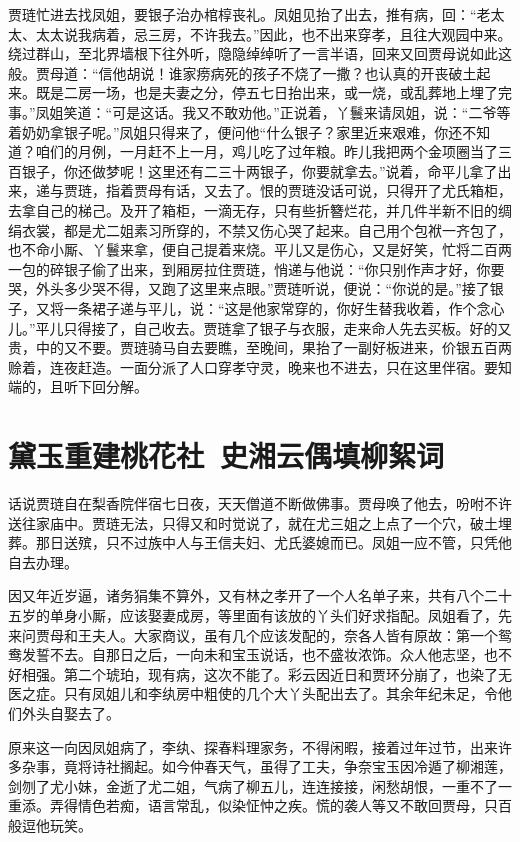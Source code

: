 \documentclass[12pt,oneside]{book}
\begin{document}
贾琏忙进去找凤姐，要银子治办棺椁丧礼。凤姐见抬了出去，推有病，回：“老太太、太太说我病着，忌三房，不许我去。”因此，也不出来穿孝，且往大观园中来。绕过群山，至北界墙根下往外听，隐隐绰绰听了一言半语，回来又回贾母说如此这般。贾母道：“信他胡说！谁家痨病死的孩子不烧了一撒？也认真的开丧破土起来。既是二房一场，也是夫妻之分，停五七日抬出来，或一烧，或乱葬地上埋了完事。”凤姐笑道：“可是这话。我又不敢劝他。”正说着，丫鬟来请凤姐，说：“二爷等着奶奶拿银子呢。”凤姐只得来了，便问他“什么银子？家里近来艰难，你还不知道？咱们的月例，一月赶不上一月，鸡儿吃了过年粮。昨儿我把两个金项圈当了三百银子，你还做梦呢！这里还有二三十两银子，你要就拿去。”说着，命平儿拿了出来，递与贾琏，指着贾母有话，又去了。恨的贾琏没话可说，只得开了尤氏箱柜，去拿自己的梯己。及开了箱柜，一滴无存，只有些折簪烂花，并几件半新不旧的绸绢衣裳，都是尤二姐素习所穿的，不禁又伤心哭了起来。自己用个包袱一齐包了，也不命小厮、丫鬟来拿，便自己提着来烧。平儿又是伤心，又是好笑，忙将二百两一包的碎银子偷了出来，到厢房拉住贾琏，悄递与他说：“你只别作声才好，你要哭，外头多少哭不得，又跑了这里来点眼。”贾琏听说，便说：“你说的是。”接了银子，又将一条裙子递与平儿，说：“这是他家常穿的，你好生替我收着，作个念心儿。”平儿只得接了，自己收去。贾琏拿了银子与衣服，走来命人先去买板。好的又贵，中的又不要。贾琏骑马自去要瞧，至晚间，果抬了一副好板进来，价银五百两赊着，连夜赶造。一面分派了人口穿孝守灵，晚来也不进去，只在这里伴宿。要知端的，且听下回分解。



\chapter{黛玉重建桃花社~史湘云偶填柳絮词}
话说贾琏自在梨香院伴宿七日夜，天天僧道不断做佛事。贾母唤了他去，吩咐不许送往家庙中。贾琏无法，只得又和时觉说了，就在尤三姐之上点了一个穴，破土埋葬。那日送殡，只不过族中人与王信夫妇、尤氏婆媳而已。凤姐一应不管，只凭他自去办理。

因又年近岁逼，诸务狷集不算外，又有林之孝开了一个人名单子来，共有八个二十五岁的单身小厮，应该娶妻成房，等里面有该放的丫头们好求指配。凤姐看了，先来问贾母和王夫人。大家商议，虽有几个应该发配的，奈各人皆有原故：第一个鸳鸯发誓不去。自那日之后，一向未和宝玉说话，也不盛妆浓饰。众人他志坚，也不好相强。第二个琥珀，现有病，这次不能了。彩云因近日和贾环分崩了，也染了无医之症。只有凤姐儿和李纨房中粗使的几个大丫头配出去了。其余年纪未足，令他们外头自娶去了。

原来这一向因凤姐病了，李纨、探春料理家务，不得闲暇，接着过年过节，出来许多杂事，竟将诗社搁起。如今仲春天气，虽得了工夫，争奈宝玉因冷遁了柳湘莲，剑刎了尤小妹，金逝了尤二姐，气病了柳五儿，连连接接，闲愁胡恨，一重不了一重添。弄得情色若痴，语言常乱，似染怔忡之疾。慌的袭人等又不敢回贾母，只百般逗他玩笑。
\end{document}
